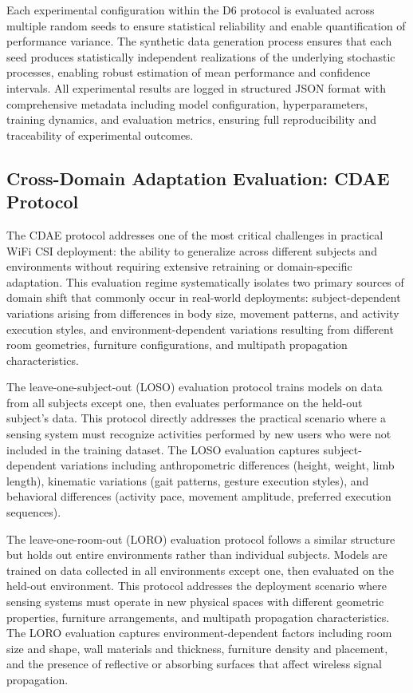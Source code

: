 \documentclass[journal]{IEEEtran}
\begin{document}
Each experimental configuration within the D6 protocol is evaluated across multiple random seeds to ensure statistical reliability and enable quantification of performance variance. The synthetic data generation process ensures that each seed produces statistically independent realizations of the underlying stochastic processes, enabling robust estimation of mean performance and confidence intervals. All experimental results are logged in structured JSON format with comprehensive metadata including model configuration, hyperparameters, training dynamics, and evaluation metrics, ensuring full reproducibility and traceability of experimental outcomes.

\subsection{Cross-Domain Adaptation Evaluation: CDAE Protocol}

The CDAE protocol addresses one of the most critical challenges in practical WiFi CSI deployment: the ability to generalize across different subjects and environments without requiring extensive retraining or domain-specific adaptation. This evaluation regime systematically isolates two primary sources of domain shift that commonly occur in real-world deployments: subject-dependent variations arising from differences in body size, movement patterns, and activity execution styles, and environment-dependent variations resulting from different room geometries, furniture configurations, and multipath propagation characteristics.

The leave-one-subject-out (LOSO) evaluation protocol trains models on data from all subjects except one, then evaluates performance on the held-out subject's data. This protocol directly addresses the practical scenario where a sensing system must recognize activities performed by new users who were not included in the training dataset. The LOSO evaluation captures subject-dependent variations including anthropometric differences (height, weight, limb length), kinematic variations (gait patterns, gesture execution styles), and behavioral differences (activity pace, movement amplitude, preferred execution sequences).

The leave-one-room-out (LORO) evaluation protocol follows a similar structure but holds out entire environments rather than individual subjects. Models are trained on data collected in all environments except one, then evaluated on the held-out environment. This protocol addresses the deployment scenario where sensing systems must operate in new physical spaces with different geometric properties, furniture arrangements, and multipath propagation characteristics. The LORO evaluation captures environment-dependent factors including room size and shape, wall materials and thickness, furniture density and placement, and the presence of reflective or absorbing surfaces that affect wireless signal propagation.
\end{document}
